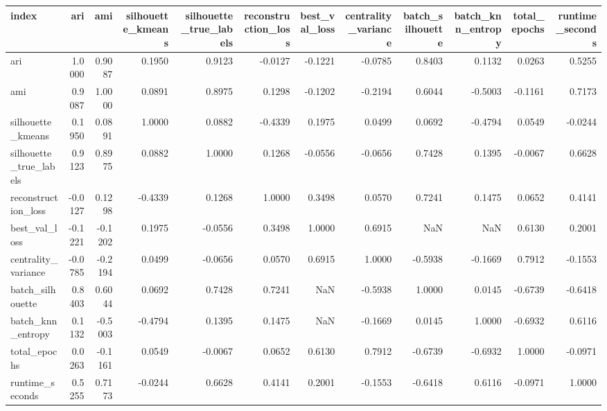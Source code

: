 \begin{tabular}{lrrrrrrrrrrr}
\toprule
index & ari & ami & silhouette\_kmeans & silhouette\_true\_labels & reconstruction\_loss & best\_val\_loss & centrality\_variance & batch\_silhouette & batch\_knn\_entropy & total\_epochs & runtime\_seconds \\
\midrule
ari & 1.0000 & 0.9087 & 0.1950 & 0.9123 & -0.0127 & -0.1221 & -0.0785 & 0.8403 & 0.1132 & 0.0263 & 0.5255 \\
ami & 0.9087 & 1.0000 & 0.0891 & 0.8975 & 0.1298 & -0.1202 & -0.2194 & 0.6044 & -0.5003 & -0.1161 & 0.7173 \\
silhouette\_kmeans & 0.1950 & 0.0891 & 1.0000 & 0.0882 & -0.4339 & 0.1975 & 0.0499 & 0.0692 & -0.4794 & 0.0549 & -0.0244 \\
silhouette\_true\_labels & 0.9123 & 0.8975 & 0.0882 & 1.0000 & 0.1268 & -0.0556 & -0.0656 & 0.7428 & 0.1395 & -0.0067 & 0.6628 \\
reconstruction\_loss & -0.0127 & 0.1298 & -0.4339 & 0.1268 & 1.0000 & 0.3498 & 0.0570 & 0.7241 & 0.1475 & 0.0652 & 0.4141 \\
best\_val\_loss & -0.1221 & -0.1202 & 0.1975 & -0.0556 & 0.3498 & 1.0000 & 0.6915 & NaN & NaN & 0.6130 & 0.2001 \\
centrality\_variance & -0.0785 & -0.2194 & 0.0499 & -0.0656 & 0.0570 & 0.6915 & 1.0000 & -0.5938 & -0.1669 & 0.7912 & -0.1553 \\
batch\_silhouette & 0.8403 & 0.6044 & 0.0692 & 0.7428 & 0.7241 & NaN & -0.5938 & 1.0000 & 0.0145 & -0.6739 & -0.6418 \\
batch\_knn\_entropy & 0.1132 & -0.5003 & -0.4794 & 0.1395 & 0.1475 & NaN & -0.1669 & 0.0145 & 1.0000 & -0.6932 & 0.6116 \\
total\_epochs & 0.0263 & -0.1161 & 0.0549 & -0.0067 & 0.0652 & 0.6130 & 0.7912 & -0.6739 & -0.6932 & 1.0000 & -0.0971 \\
runtime\_seconds & 0.5255 & 0.7173 & -0.0244 & 0.6628 & 0.4141 & 0.2001 & -0.1553 & -0.6418 & 0.6116 & -0.0971 & 1.0000 \\
\bottomrule
\end{tabular}
